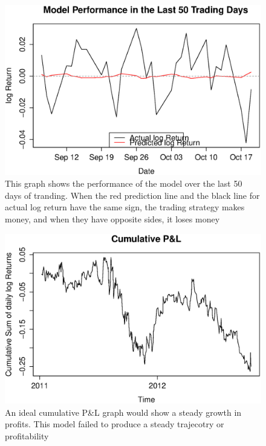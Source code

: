 \documentclass{article}
\begin{document}
\begin{figure}[H]
\begin{center}
\includegraphics[width=1\columnwidth]{performance.eps}
\caption{This graph shows the performance of the model over the last 50 days of tranding.  When the red prediction line and the black line for actual log return have the same sign, the trading strategy makes money, and when they have opposite sides, it loses money}
\end{center}
\end{figure}


\begin{figure}[H]
\begin{center}
\includegraphics[width=1\columnwidth]{pl.eps}
\caption{An ideal cumulative P&L graph would show a steady growth in profits.  This model failed to produce a steady trajecotry or profitability}
\end{center}
\end{figure}
\end{document}
